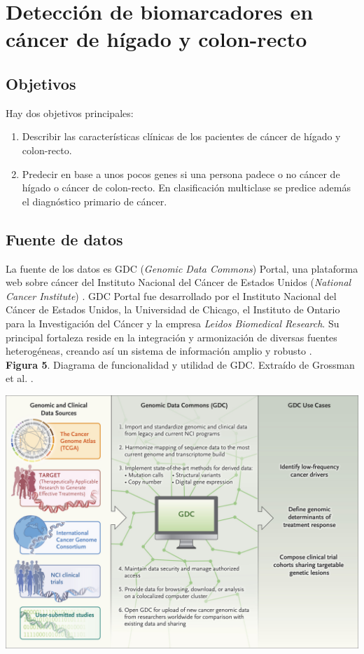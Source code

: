 \chapter{Detección de biomarcadores en cáncer de hígado y colon-recto}

\section{Objetivos}

Hay dos objetivos principales:
\begin{enumerate}
	\item Describir las características clínicas de los pacientes de cáncer de hígado y colon-recto.
	\item Predecir en base a unos pocos genes si una persona padece o no cáncer de hígado o cáncer de colon-recto. En clasificación multiclase se predice además el diagnóstico primario de cáncer.
\end{enumerate}

\section{Fuente de datos}

La fuente de los datos es GDC (\textit{Genomic Data Commons}) Portal, una plataforma web sobre cáncer del Instituto Nacional del Cáncer de Estados Unidos (\textit{National Cancer Institute}) \cite{GDCPortal, NationalCancerInstitute}. GDC Portal fue desarrollado por el Instituto Nacional del Cáncer de Estados Unidos, la Universidad de Chicago, el Instituto de Ontario para la Investigación del Cáncer y la empresa \textit{Leidos Biomedical Research}. Su principal fortaleza reside en la integración y armonización de diversas fuentes heterogéneas, creando así un sistema de información amplio y robusto \cite{Grossman2016}. \\

\newpage
\textbf{Figura 5}. Diagrama de funcionalidad y utilidad de GDC. Extraído de Grossman et al. \cite{Grossman2016}.
\begin{center}
	\includegraphics[width=1\textwidth]{figuras/05_funcionamiento_gdc.jpeg} 
\end{center}

